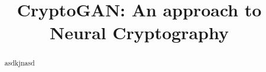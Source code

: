 \documentclass[12pt]{article}
\title{CryptoGAN: An approach to Neural Cryptography}
\begin{document}
  \maketitle

  \begin{abstract}
    asdkjnasd
  \end{abstract}
\end{document}
